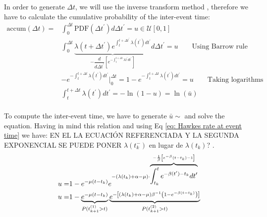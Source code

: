 In order to generate $\Delta t$, we will use the inverse transform method \cite{Toral}, therefore we have to calculate the cumulative probability of the inter-event time:
\begin{equation}
    \begin{split}
        \text{accum}(\Delta t)=&\int_{0}^{\Delta t}\text{PDF}\left( \Delta t^\prime \right)d\Delta t^\prime = u\in\mathcal{U}  [0,1]\\
        &\int_{0}^{\Delta t} \underbrace{\lambda(t+\Delta t^\prime)e^{\int_{t}^{t+\Delta t^\prime}\lambda(t^{\prime})dt^{\prime}}}_{-\dfrac{d}{d\Delta t^{\prime}}\left[ e^{-\int_{t}^{t+\Delta t}\lambda t^\prime dt^\prime} \right]}d\Delta t^\prime=u \qquad  \text{Using Barrow rule}\\
        &-e^{-\int_{t}^{t+\Delta t}\lambda(t^\prime)dt^\prime}\Big|_{0}^{\Delta t}=1-e^{-\int_{t}^{t+\Delta t}\lambda(t^\prime)dt^\prime}=u\qquad  \text{Taking logarithms}\\
        &\int_{t}^{t+\Delta t}\lambda(t^\prime)dt^\prime=-\ln(1-u) = \ln (\bar{u})\\
    \end{split}
    \label{eq: cumulative probability}
\end{equation}

To compute the inter-event time, we have to generate $\bar{u}\sim$ and solve the equation. Having in mind this relation and using Eq \ref{eq: Hawkes rate at event time} we have:
EN EL LA ECUACIÓN REFERENCIADA Y LA SEGUNDA EXPONENCIAL SE PUEDE PONER $\lambda(t_k^-)$ en lugar de $\lambda(t_k)$? .
\begin{equation}
    \begin{split}
        u=&1-e^{-\mu(t-t_k)}e^{-(\lambda(t_k)+\alpha-\mu)\cdot\overbrace{\int_{t_k}^{t}e^{-\beta(t^\prime)-t_k}dt^\prime}^{-\frac{1}{\beta}\left[ e^{-\beta}(t-t_k)-1 \right]}}\\
        u=&1-\underbrace{e^{-\mu(t-t_k)}}_{P(t_{k+1}^{(1)}>t)}\underbrace{e^{-\left[ (\lambda(t_k)+\alpha-\mu)\beta^{-1}\left( 1-e^{-\beta(t-t_k)} \right) \right]}}_{{P(t_{k+1}^{(2)}>t)}}
    \end{split}
    \label{eq: u = 1 - P(t_{k+1} > t)P(t_{k+1} > t), previo al composition method}
\end{equation}

